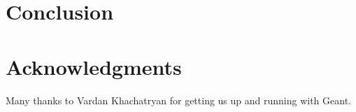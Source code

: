 \documentclass[letter,
               biblatex,     %
               keeplastbox,   %
               ]{jacow}
\begin{document}
\section{Conclusion}

\section{Acknowledgments}

Many thanks to Vardan Khachatryan for getting us up and running with Geant.


\printbibliography

\clearpage
\end{document}
